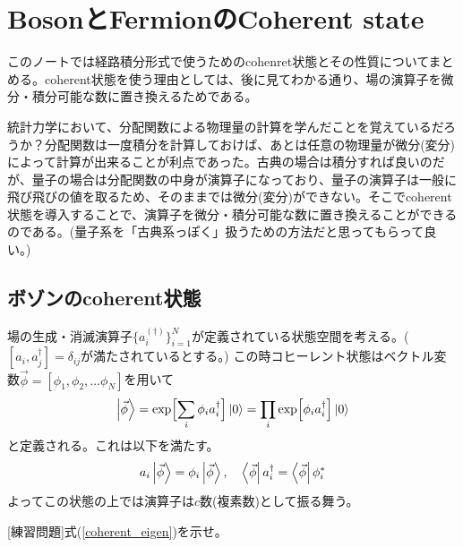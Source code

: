 \documentclass[a4paper,12pt]{jsarticle}
\newcommand{\poi}[1]{\{ #1 \}}
\newcommand{\Biglr}[1]{\Bigl[ #1 \Bigr]}
\begin{document}
\section{BosonとFermionのCoherent state}
このノートでは経路積分形式で使うためのcohenret状態とその性質についてまとめる。coherent状態を使う理由としては、後に見てわかる通り、場の演算子を微分・積分可能な数に置き換えるためである。

統計力学において、分配関数による物理量の計算を学んだことを覚えているだろうか？分配関数は一度積分を計算しておけば、あとは任意の物理量が微分(変分)によって計算が出来ることが利点であった。古典の場合は積分すれば良いのだが、量子の場合は分配関数の中身が演算子になっており、量子の演算子は一般に飛び飛びの値を取るため、そのままでは微分(変分)ができない。そこでcoherent状態を導入することで、演算子を微分・積分可能な数に置き換えることができるのである。(量子系を「古典系っぽく」扱うための方法だと思ってもらって良い。)

\subsection{ボゾンのcoherent状態}
場の生成・消滅演算子$\poi{a^{(\dagger)}_i}_{i=1}^N$が定義されている状態空間を考える。($[a_i, a_j^\dagger] = \delta_{ij}$が満たされているとする。)
この時コヒーレント状態はベクトル変数$\vec{\phi} = [\phi_1, \phi_2, \dots \phi_N]$を用いて
\begin{eqnarray}
  \ket{\vec{\phi}} = \exp\Biglr{\sum_i \phi_i a_i^\dagger}\ket{0} = \prod_i \exp\Biglr{\phi_i a_i^\dagger}\ket{0}
\end{eqnarray}
と定義される。これは以下を満たす。
\begin{eqnarray}
  a_i \ket{\vec{\phi}} = \phi_i \ket{\vec{\phi}}, \quad \bra{\vec{\phi}} a_i^\dagger = \bra{\vec{\phi}} \phi_i^* \label{coherent_eigen}
\end{eqnarray}
よってこの状態の上では演算子は$c$数(複素数)として振る舞う。

[練習問題]式(\ref{coherent_eigen})を示せ。
\end{document}
